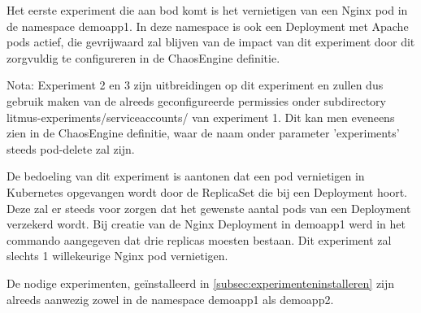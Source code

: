Het eerste experiment die aan bod komt is het vernietigen van een Nginx pod in de namespace demoapp1. In deze namespace is ook een Deployment met Apache pods actief, die gevrijwaard zal blijven van de impact van dit experiment door dit zorgvuldig te configureren in de ChaosEngine definitie. 

Nota: Experiment 2 en 3 zijn uitbreidingen op dit experiment en zullen dus gebruik maken van de alreeds geconfigureerde permissies onder subdirectory litmus-experiments/serviceaccounts/ van experiment 1. Dit kan men eveneens zien in de ChaosEngine definitie, waar de naam onder parameter 'experiments' steeds pod-delete zal zijn. 

De bedoeling van dit experiment is aantonen dat een pod vernietigen in Kubernetes opgevangen wordt door de ReplicaSet die bij een Deployment hoort. Deze zal er steeds voor zorgen dat het gewenste aantal pods van een Deployment verzekerd wordt. Bij creatie van de Nginx Deployment in demoapp1 werd in het commando aangegeven dat drie replicas moesten bestaan. Dit experiment zal slechts 1 willekeurige Nginx pod vernietigen.  

De nodige experimenten, geïnstalleerd in \ref{subsec:experimenteninstalleren} zijn alreeds aanwezig zowel in de namespace demoapp1 als demoapp2.
  
